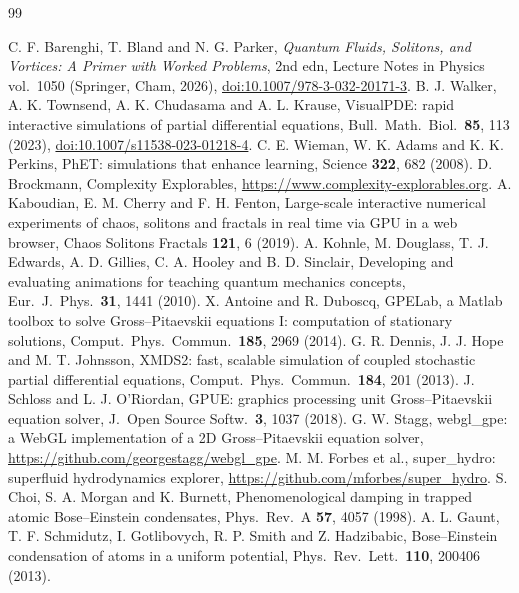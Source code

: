 \documentclass[11pt,a4paper]{article}
\begin{document}
\begin{thebibliography}{99}\small\setlength{\itemsep}{1pt}

 C. F. Barenghi, T. Bland and N. G. Parker, \emph{Quantum Fluids, Solitons, and Vortices: A Primer with Worked Problems}, 2nd edn, Lecture Notes in Physics vol.\ 1050 (Springer, Cham, 2026), \href{https://doi.org/10.1007/978-3-032-20171-3}{doi:10.1007/978-3-032-20171-3}.
 B. J. Walker, A. K. Townsend, A. K. Chudasama and A. L. Krause, VisualPDE: rapid interactive simulations of partial differential equations, Bull.\ Math.\ Biol.\ \textbf{85}, 113 (2023), \href{https://doi.org/10.1007/s11538-023-01218-4}{doi:10.1007/s11538-023-01218-4}.
 C. E. Wieman, W. K. Adams and K. K. Perkins, PhET: simulations that enhance learning, Science \textbf{322}, 682 (2008).
 D. Brockmann, Complexity Explorables, \url{https://www.complexity-explorables.org}.
 A. Kaboudian, E. M. Cherry and F. H. Fenton, Large-scale interactive numerical experiments of chaos, solitons and fractals in real time via GPU in a web browser, Chaos Solitons Fractals \textbf{121}, 6 (2019).
 A. Kohnle, M. Douglass, T. J. Edwards, A. D. Gillies, C. A. Hooley and B. D. Sinclair, Developing and evaluating animations for teaching quantum mechanics concepts, Eur.\ J.\ Phys.\ \textbf{31}, 1441 (2010).
 X. Antoine and R. Duboscq, GPELab, a Matlab toolbox to solve Gross--Pitaevskii equations I: computation of stationary solutions, Comput.\ Phys.\ Commun.\ \textbf{185}, 2969 (2014).
 G. R. Dennis, J. J. Hope and M. T. Johnsson, XMDS2: fast, scalable simulation of coupled stochastic partial differential equations, Comput.\ Phys.\ Commun.\ \textbf{184}, 201 (2013).
 J. Schloss and L. J. O'Riordan, GPUE: graphics processing unit Gross--Pitaevskii equation solver, J.\ Open Source Softw.\ \textbf{3}, 1037 (2018).
 G. W. Stagg, webgl\_gpe: a WebGL implementation of a 2D Gross--Pitaevskii equation solver, \url{https://github.com/georgestagg/webgl_gpe}.
 M. M. Forbes et al., super\_hydro: superfluid hydrodynamics explorer, \url{https://github.com/mforbes/super_hydro}.
 S. Choi, S. A. Morgan and K. Burnett, Phenomenological damping in trapped atomic Bose--Einstein condensates, Phys.\ Rev.\ A \textbf{57}, 4057 (1998).
 A. L. Gaunt, T. F. Schmidutz, I. Gotlibovych, R. P. Smith and Z. Hadzibabic, Bose--Einstein condensation of atoms in a uniform potential, Phys.\ Rev.\ Lett.\ \textbf{110}, 200406 (2013).

\end{thebibliography}
\end{document}
